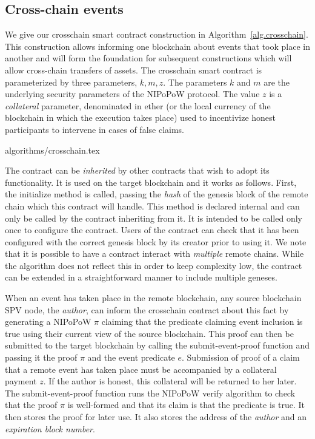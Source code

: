 \subsection*{Cross-chain events}

We give our \textsf{crosschain} smart contract construction in
Algorithm~\ref{alg.crosschain}. This construction allows informing one
blockchain about events that took place in another and will form the foundation
for subsequent constructions which will allow cross-chain transfers of
assets. The \textsf{crosschain} smart contract is parameterized by three
parameters, $k, m, z$. The parameters $k$ and $m$ are the underlying security
parameters of the NIPoPoW protocol. The value $z$ is a \emph{collateral}
parameter, denominated in ether (or the local currency of the blockchain in
which the execution takes place) used to incentivize honest participants to
intervene in cases of false claims.

{algorithms/crosschain.tex}

The contract can be \emph{inherited} by other contracts that wish to adopt its
functionality. It is used on the target blockchain and it works as follows.
First, the \textsf{initialize} method is called, passing the \emph{hash} of the
genesis block of the remote chain which this contract will handle. This method
is declared \textsf{internal} and can only be called by the contract inheriting
from it. It is intended to be called only once to configure the contract. Users
of the contract can check that it has been configured with the correct genesis
block by its creator prior to using it. We note that it is possible to have a
contract interact with \emph{multiple} remote chains. While the algorithm does
not reflect this in order to keep complexity low, the contract can be extended
in a straightforward manner to include multiple geneses.

When an event has taken place in the remote blockchain, any source blockchain
SPV node, the \emph{author}, can inform the \textsf{crosschain} contract about
this fact by generating a NIPoPoW $\pi$ claiming that the predicate claiming
event inclusion is \textsf{true} using their current view of the source
blockchain. This proof can then be submitted to the target blockchain by calling
the \textsf{submit-event-proof} function and passing it the proof $\pi$ and the
event predicate $e$. Submission of proof of a claim that a remote event has
taken place must be accompanied by a collateral payment $z$. If the author
is honest, this collateral will be returned to her later. The
\textsf{submit-event-proof} function runs the NIPoPoW \textsf{verify} algorithm
to check that the proof $\pi$ is well-formed and that its claim is that the
predicate is \textsf{true}. It then stores the proof for later use. It also
stores the address of the \emph{author} and an \emph{expiration block number}.

